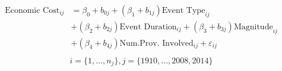 \begin{align}
\begin{split}
\text{Economic Cost}_{ij}&=\beta_0+b_{0j}+(\beta_{1}+b_{1j})\text{Event Type}_{ij}\\ &+(\beta_{2}+b_{2j})\text{Event Duration}_{ij}+(\beta_{3}+b_{3j})\text{Magnitude}_{ij}\\ &+(\beta_{4}+b_{4j})\text{Num.Prov. Involved}_{ij}+\varepsilon_{ij}\\
\end{split}
\label{econ_time}
\end{align}
\begin{equation*}
i=\{1,...,n_j\},
j=\{1910,...,2008, 2014\}
\end{equation*}
